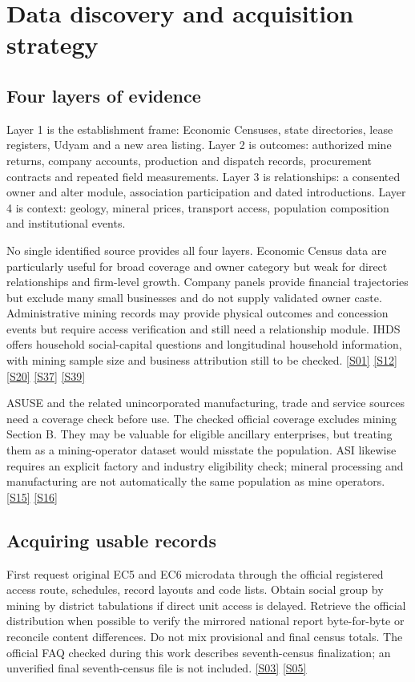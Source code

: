 \documentclass[11pt,a4paper]{report}
\begin{document}
\chapter{Data discovery and acquisition strategy}
\section{Four layers of evidence}
Layer 1 is the establishment frame: Economic Censuses, state directories, lease registers, Udyam and a new area listing. Layer 2 is outcomes: authorized mine returns, company accounts, production and dispatch records, procurement contracts and repeated field measurements. Layer 3 is relationships: a consented owner and alter module, association participation and dated introductions. Layer 4 is context: geology, mineral prices, transport access, population composition and institutional events.

No single identified source provides all four layers. Economic Census data are particularly useful for broad coverage and owner category but weak for direct relationships and firm-level growth. Company panels provide financial trajectories but exclude many small businesses and do not supply validated owner caste. Administrative mining records may provide physical outcomes and concession events but require access verification and still need a relationship module. IHDS offers household social-capital questions and longitudinal household information, with mining sample size and business attribution still to be checked. \hyperlink{S01}{[S01]} \hyperlink{S12}{[S12]} \hyperlink{S20}{[S20]} \hyperlink{S37}{[S37]} \hyperlink{S39}{[S39]}

ASUSE and the related unincorporated manufacturing, trade and service sources need a coverage check before use. The checked official coverage excludes mining Section B. They may be valuable for eligible ancillary enterprises, but treating them as a mining-operator dataset would misstate the population. ASI likewise requires an explicit factory and industry eligibility check; mineral processing and manufacturing are not automatically the same population as mine operators. \hyperlink{S15}{[S15]} \hyperlink{S16}{[S16]}

\section{Acquiring usable records}
First request original EC5 and EC6 microdata through the official registered access route, schedules, record layouts and code lists. Obtain social group by mining by district tabulations if direct unit access is delayed. Retrieve the official distribution when possible to verify the mirrored national report byte-for-byte or reconcile content differences. Do not mix provisional and final census totals. The official FAQ checked during this work describes seventh-census finalization; an unverified final seventh-census file is not included. \hyperlink{S03}{[S03]} \hyperlink{S05}{[S05]}
\end{document}

